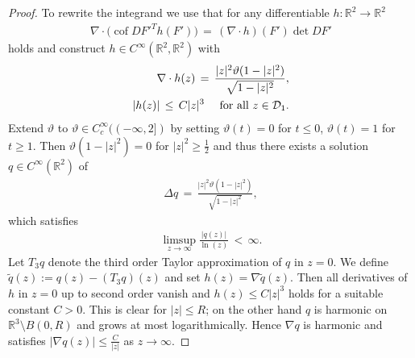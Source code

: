 \documentclass[reqno,makeidx,12pt]{amsart}
\theoremstyle{note}
\theoremstyle{definition}
\begin{document}
\begin{proof}
To rewrite the integrand we use that  for any differentiable $h:{\mathbb R}^2\to{\mathbb R}^2$ 
\begin{gather*}
	\nabla\cdot \Big(\operatorname{cof} DF'^T h(F')\Big)\,=\, (\nabla\cdot  h)(F') \det DF'
\end{gather*}
holds and construct  $h\in C^\infty({\mathbb R}^2,{\mathbb R}^2)$ with
\begin{align}
	\nabla\cdot  h(z) \,=\, \frac{|z|^2{\vartheta}(1-|z|^2)}{\sqrt{1-|z|^2}}, \notag\\
	|h(z)| \,\leq\,  C |z|^3 \quad\text{ for all }z\in {\mathcal{D}}_1. \label{eq:h-cube}
\end{align}
Extend ${\vartheta}$ to ${\vartheta}\in C^\infty_c((-\infty,2])$ by setting ${\vartheta}(t)=0$ for $t\leq 0$, ${\vartheta}(t)=1$ for $t\geq 1$. Then ${\vartheta}(1-|z|^2)=0$ for $|z|^2\geq \frac{1}{2}$ and thus there exists a solution $q\in C^\infty({\mathbb R}^2)$ of
\begin{gather*}
	\Delta q\,=\, \frac{|z|^2{\vartheta}(1-|z|^2)}{\sqrt{1-|z|^2}},
\end{gather*}
which satisfies
\begin{gather*}
	\limsup_{z\to\infty} \frac{|q(z)|}{\ln (z)}\,<\,\infty.
\end{gather*}
Let  $T_3q$ denote the third order Taylor approximation of $q$ in $z=0$. We define $\tilde{q}(z):= q(z) - (T_3q)(z)$ and set $h(z)=\nabla \tilde{q}(z)$. Then all derivatives  of $h$  in $z=0$ up to second order vanish and $h(z)\leq C |z|^3$ holds for a suitable constant $C>0$. This is clear for $|z|\leq R$; on the other hand $q$ is harmonic on ${\mathbb R}^3\setminus B(0,R)$ and grows at most logarithmically. Hence $\nabla q$ is harmonic and satisfies $|\nabla q(z)|\leq \frac{C}{|z|}$ as $z\to\infty$.


\end{proof}
\end{document}
